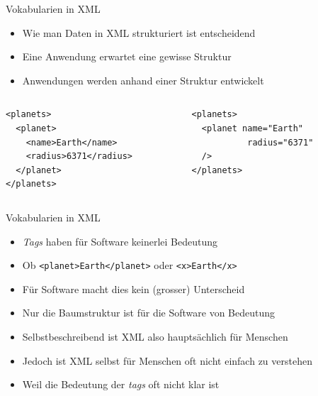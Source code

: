 \documentclass{beamer}
\begin{document}
\begin{frame}[fragile]{Vokabularien in XML}
	
	\begin{itemize}
		\item Wie man Daten in XML strukturiert ist entscheidend
		\item Eine Anwendung erwartet eine gewisse Struktur
		\item Anwendungen werden anhand einer Struktur entwickelt
	\end{itemize}
	
	\begin{columns}[T] %
		\begin{column}{.52\textwidth}
			\begin{lstlisting}
<planets>
  <planet>
    <name>Earth</name>
    <radius>6371</radius>
  </planet>
</planets>
			\end{lstlisting}
		\end{column}%
		\hfill%
		\begin{column}{.44\textwidth}
			\begin{lstlisting}
<planets>
  <planet name="Earth" 
           radius="6371" 
  />
</planets>
			\end{lstlisting}
		\end{column}%
	\end{columns}
	
\end{frame}

\begin{frame}{Vokabularien in XML}
	
	\begin{itemize}
		\item \emph{Tags} haben für Software keinerlei Bedeutung
		\item Ob \texttt{<planet>Earth</planet>} oder \texttt{<x>Earth</x>}
		\item Für Software macht dies kein (grosser) Unterscheid
		\item Nur die Baumstruktur ist für die Software von Bedeutung
		\item Selbstbeschreibend ist XML also hauptsächlich für Menschen
		\item Jedoch ist XML selbst für Menschen oft nicht einfach zu verstehen
		\item Weil die Bedeutung der \emph{tags} oft nicht klar ist
	\end{itemize}
	
\end{frame}
\end{document}
